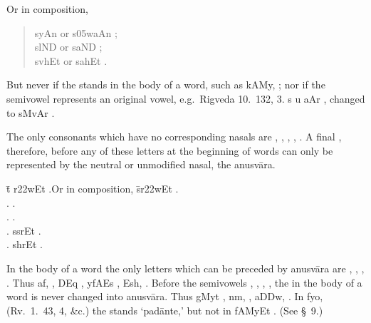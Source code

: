 \noindent Or in composition,

\begin{quote}
  {\dn s\2yAn\2}  or {\dn s\305w\1aAn\2} ;\\
  {\dn s\2lND\2}  or {\dn s\1aND\2} ;\\
  {\dn s\2vhEt}  or {\dn s\1ahEt} .\\
\end{quote}

But never if the {\dn {}}  stands in the body of a word, such as
{\dn kAMy,} ; nor if the semivowel represents an original
vowel, e.g.\ Rigveda 10.\ 132, 3. {\dn s u aAr} ,
changed to {\dn sMvAr} .
%

\s The only consonants which have no corresponding nasals are {\dn {}}
, {\dn {}} , {\dn {}} , {\dn {}} , {\dn {}} . A final
{\dn {}} , therefore, before any of these letters at the beginning of
words can only be represented by the neutral or unmodified nasal, the
anusvāra.

\begin{tabbing}
  \hspace*{1cm}\={\dn t\2 r\322wEt} .\hspace*{1cm}Or in
  composition, \={\dn s\2r\322wEt} .\\
   .  .\\
   . 
  .\\
   . \> {\dn s\2srEt} .\\
   . \> {\dn s\2hrEt} .\\
\end{tabbing}

\s In the body of a word the only letters which can be preceded by
anusvāra are {\dn {}} , {\dn {}} , {\dn {}} , {\dn {}} . Thus
{\dn a\2f,} , {\dn D\2Eq} , {\dn yfA\2Es}
, {\dn Es\2h,} . Before the semivowels {\dn {}} ,
{\dn {}} , {\dn {}} , {\dn {}} , the {\dn {}}  in the body of a
word is never changed into anusvāra. Thus {\dn gMyt\?} ,
{\dn nm\5,} , {\dn a\3DDw,} .
In {\dn f\2yo,}  (Rv.\ 1.\ 43, 4, \&c.) the  stands
`padānte,' but not in {\dn fAMyEt} . (See \S~9.)
%

